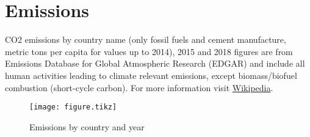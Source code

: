\documentclass{article}
\begin{document}
\section{Emissions}
CO2 emissions by country name (only fossil fuels and cement manufacture, metric
tons per capita for values up to 2014), 2015 and 2018 figures are from
Emissions Database for Global Atmospheric Research (EDGAR) and include all
human activities leading to climate relevant emissions, except biomass/biofuel
combustion (short-cycle carbon). For more information visit
\href{https://en.wikipedia.org/wiki/List_of_countries_by_carbon_dioxide_emissions_per_capita}{Wikipedia}.

\begin{table}
        \centering
        \caption{Emissions (\si{\tonne\per\capita}) by country and year}
        
\end{table}

\begin{figure}
        \centering
        \texttt{[image: figure.tikz]}\\
        \caption{Emissions by country and year}
\end{figure}
\end{document}
